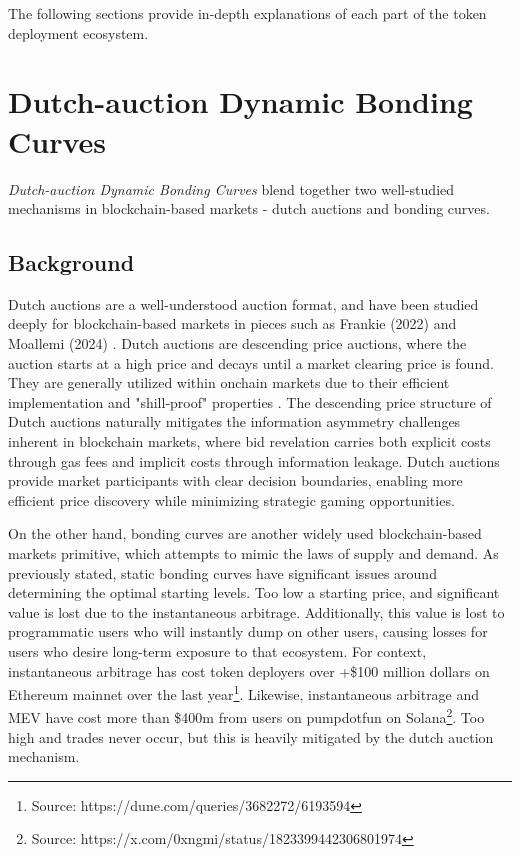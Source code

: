 \documentclass[sigconf,nonacm,prologue,table]{acmart}
\numberwithin{equation}{section}
\theoremstyle{definition}
\theoremstyle{remark}
\begin{document}
The following sections provide in-depth explanations of each part of the token deployment ecosystem.

\section{Dutch-auction Dynamic Bonding Curves} 
\label{sec:bonding}

\emph{Dutch-auction Dynamic Bonding Curves} blend together two well-studied mechanisms in blockchain-based markets - dutch auctions and bonding curves. 

\subsection{Background}

Dutch auctions are a well-understood auction format, and have been studied deeply for blockchain-based markets in pieces such as Frankie (2022) \cite{frankie2022gda} and Moallemi (2024) \cite{moallemi2024loss}. Dutch auctions are descending price auctions, where the auction starts at a high price and decays until a market clearing price is found. They are generally utilized within onchain markets due to their efficient implementation and "shill-proof" properties \cite{komo2024shillproofauctions}. The descending price structure of Dutch auctions naturally mitigates the information asymmetry challenges inherent in blockchain markets, where bid revelation carries both explicit costs through gas fees and implicit costs through information leakage. Dutch auctions provide market participants with clear decision boundaries, enabling more efficient price discovery while minimizing strategic gaming opportunities.

On the other hand, bonding curves are another widely used blockchain-based markets primitive, which attempts to mimic the laws of supply and demand. As previously stated, static bonding curves have significant issues around determining the optimal starting levels. Too low a starting price, and significant value is lost due to the instantaneous arbitrage. Additionally, this value is lost to programmatic users who will instantly dump on other users, causing losses for users who desire long-term exposure to that ecosystem. For context, instantaneous arbitrage has cost token deployers over +\$100 million dollars on Ethereum mainnet over the last year\footnote{Source: https://dune.com/queries/3682272/6193594}. Likewise, instantaneous arbitrage and MEV have cost more than \$400m from users on pumpdotfun on Solana\footnote{Source: https://x.com/0xngmi/status/1823399442306801974}. 
Too high and trades never occur, but this is heavily mitigated by the dutch auction mechanism.
\end{document}
